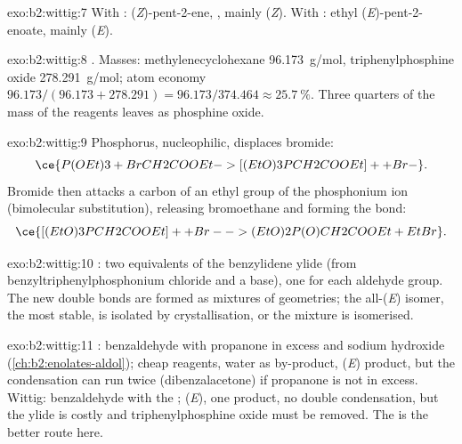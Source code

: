 \begin{solution}{exo:b2:wittig:7}
With : (\textit{Z})-pent-2-ene, , mainly (\textit{Z}). With
: ethyl (\textit{E})-pent-2-enoate, mainly (\textit{E}).
\end{solution}

\begin{solution}{exo:b2:wittig:8}
. Masses: methylenecyclohexane \qty{96.173}{g/mol},
triphenylphosphine oxide \qty{278.291}{g/mol}; atom economy $96.173/(96.173 + 278.291) =
96.173/374.464 \approx 25.7~\%$. Three quarters of the mass of the reagents leaves as phosphine oxide.
\end{solution}

\begin{solution}{exo:b2:wittig:9}
Phosphorus, nucleophilic, displaces bromide:
\begin{equation*}
\ce{P(OEt)3 + BrCH2COOEt -> [(EtO)3PCH2COOEt]+ + Br-}.
\end{equation*}
Bromide
then attacks a carbon of an ethyl group of the phosphonium ion (bimolecular substitution), releasing
bromoethane and forming the  bond:
\begin{equation*}
\ce{[(EtO)3PCH2COOEt]+ + Br- -> (EtO)2P(O)CH2COOEt + EtBr}.
\end{equation*}
\end{solution}

\begin{solution}{exo:b2:wittig:10}
: two equivalents of the
benzylidene ylide (from benzyltriphenylphosphonium chloride and a base), one for each aldehyde group.
The new double bonds are formed as mixtures of geometries; the all-(\textit{E}) isomer, the most
stable, is isolated by crystallisation, or the mixture is isomerised.
\end{solution}

\begin{solution}{exo:b2:wittig:11}
: benzaldehyde with propanone in excess and sodium hydroxide (\cref{ch:b2:enolates-aldol});
cheap reagents, water as by-product, (\textit{E}) product, but the condensation can run twice
(dibenzalacetone) if propanone is not in excess. Wittig: benzaldehyde with the 
; (\textit{E}), one product, no double condensation, but the ylide is costly and
triphenylphosphine oxide must be removed. The  is the better route here.
\end{solution}


